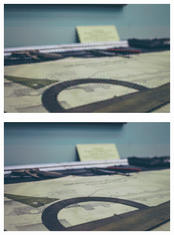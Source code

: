 \documentclass{article}
\begin{document}
\begin{figure}
\begin{subfigure}[b]{0.49 \textwidth}
    \end{subfigure}
\end{figure}

\begin{figure}
\ContinuedFloat
    \begin{subfigure}[b]{0.49 \textwidth}
    \includegraphics[width=\textwidth]{Images/autoencoder/reconstructed/500/test3_10.png}
    \end{subfigure}
    \begin{subfigure}[b]{0.49 \textwidth}
    \includegraphics[width=\textwidth]{Images/autoencoder/reconstructed/500/test3_80.png}
    \end{subfigure}
    \begin{subfigure}[b]{0.49 \textwidth}

\end{subfigure}
\end{figure}
\end{document}
